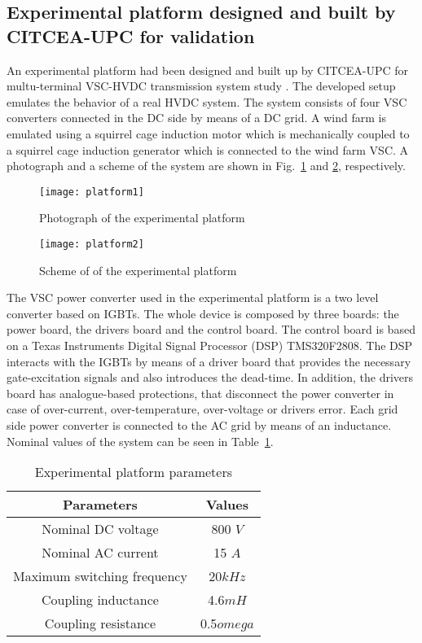 \documentclass[conference]{IEEEtran}
\begin{document}
\subsection{Experimental platform designed and built by CITCEA-UPC for validation}
An experimental platform had been designed and built up by CITCEA-UPC for multu-terminal VSC-HVDC transmission system study \cite{Agusti}. The developed setup emulates the behavior of a real HVDC system. The system consists of four VSC converters connected in the DC side by means of a DC grid. A wind farm is emulated using a squirrel cage induction motor which is mechanically coupled to a squirrel cage induction generator which is connected to the wind farm VSC. A photograph and a scheme of the system are shown in Fig.~\ref{platform1} and \ref{platform2}, respectively.
\begin{figure}[!ht]
\centering
\texttt{[image: platform1]}
\caption{Photograph of the experimental platform \cite{Agusti}}
\label{platform1}
\end{figure}
\begin{figure}[!ht]
\centering
\texttt{[image: platform2]}
\caption{Scheme of of the experimental platform \cite{Agusti}}
\label{platform2}
\end{figure}

The VSC power converter used in the experimental platform is a two level converter based on IGBTs. The whole device is composed by three boards: the power board, the drivers board and the control board. The control board is based on a Texas Instruments Digital Signal Processor (DSP) TMS320F2808. The DSP interacts with the IGBTs by means of a driver board that provides the necessary gate-excitation signals and also introduces the dead-time. In addition, the drivers board has analogue-based protections, that disconnect the power converter in case of over-current, over-temperature, over-voltage or drivers error. Each grid side power converter is connected to the AC grid by means of an inductance. Nominal values of the system can be seen in Table~\ref{platformParameters}.
\begin{table}[!ht]
\centering
\caption{Experimental platform parameters}
\begin{tabular}{| c | c | }
\hline
Parameters & Values  \\\hline
Nominal DC voltage & 800 $V$\\\hline
Nominal AC current & 15 $A$  \\\hline
Maximum switching frequency & 20$kHz$ \\\hline
Coupling inductance & 4.6$mH$\\\hline
Coupling resistance & 0.5$omega$\\\hline
\end{tabular}
\label{platformParameters}
\end{table}
\end{document}
